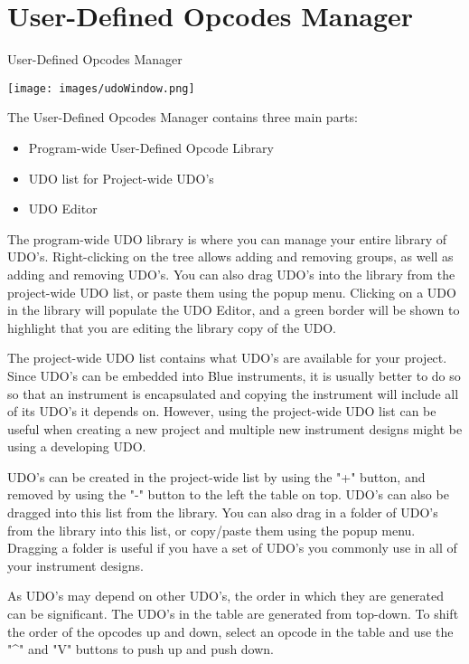\section{User-Defined Opcodes Manager}\label{udoManager}

User-Defined Opcodes Manager

\texttt{[image: images/udoWindow.png]}

The User-Defined Opcodes Manager contains three main parts:

\begin{itemize}
\tightlist
\item
  Program-wide User-Defined Opcode Library
\item
  UDO list for Project-wide UDO's
\item
  UDO Editor
\end{itemize}

The program-wide UDO library is where you can manage your entire library
of UDO's. Right-clicking on the tree allows adding and removing groups,
as well as adding and removing UDO's. You can also drag UDO's into the
library from the project-wide UDO list, or paste them using the popup
menu. Clicking on a UDO in the library will populate the UDO Editor, and
a green border will be shown to highlight that you are editing the
library copy of the UDO.

The project-wide UDO list contains what UDO's are available for your
project. Since UDO's can be embedded into Blue instruments, it is
usually better to do so so that an instrument is encapsulated and
copying the instrument will include all of its UDO's it depends on.
However, using the project-wide UDO list can be useful when creating a
new project and multiple new instrument designs might be using a
developing UDO.

UDO's can be created in the project-wide list by using the "+" button,
and removed by using the "-" button to the left the table on top. UDO's
can also be dragged into this list from the library. You can also drag
in a folder of UDO's from the library into this list, or copy/paste them
using the popup menu. Dragging a folder is useful if you have a set of
UDO's you commonly use in all of your instrument designs.

As UDO's may depend on other UDO's, the order in which they are
generated can be significant. The UDO's in the table are generated from
top-down. To shift the order of the opcodes up and down, select an
opcode in the table and use the "\^{}" and "V" buttons to push up and
push down.


